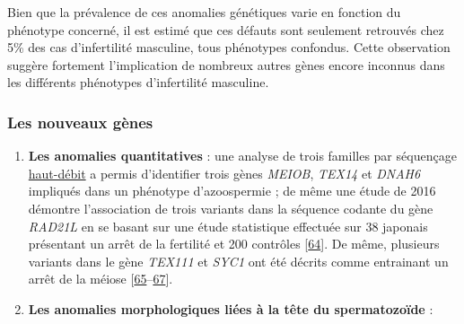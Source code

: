 \documentclass[12pt,a4paper,twoside]{ugathesis}
\theoremstyle{definition}
\theoremstyle{definition}
\theoremstyle{definition}
\theoremstyle{remark}
\begin{document}
Bien que la prévalence de ces anomalies génétiques varie en fonction du
phénotype concerné, il est estimé que ces défauts sont seulement
retrouvés chez 5\% des cas d'infertilité masculine, tous phénotypes
confondus. Cette observation suggère fortement l'implication de nombreux
autres gènes encore inconnus dans les différents phénotypes
d'infertilité masculine.

\newpage

\subsubsection{Les nouveaux gènes}\label{les-nouveaux-genes}

\begin{enumerate}
\def\labelenumi{\arabic{enumi}.}
\item
  \textbf{Les anomalies quantitatives} : une analyse de trois familles
  par séquençage \protect\hyperlink{ngs}{haut-débit} a permis
  d'identifier trois gènes \emph{MEIOB}, \emph{TEX14} et \emph{DNAH6}
  impliqués dans un phénotype d'azoospermie ; de même une étude de 2016
  démontre l'association de trois variants dans la séquence codante du
  gène \emph{RAD21L} en se basant sur une étude statistique effectuée
  sur 38 japonais présentant un arrêt de la fertilité et 200 contrôles
  {[}\protect\hyperlink{ref-Minase2017}{64}{]}. De même, plusieurs
  variants dans le gène \emph{TEX111} et \emph{SYC1} ont été décrits
  comme entrainant un arrêt de la méiose
  {[}\protect\hyperlink{ref-Yatsenko2015}{65}--\protect\hyperlink{ref-Maor-Sagie2015}{67}{]}.
\item
  \textbf{Les anomalies morphologiques liées à la tête du spermatozoïde}
  :


\end{enumerate}
\end{document}
